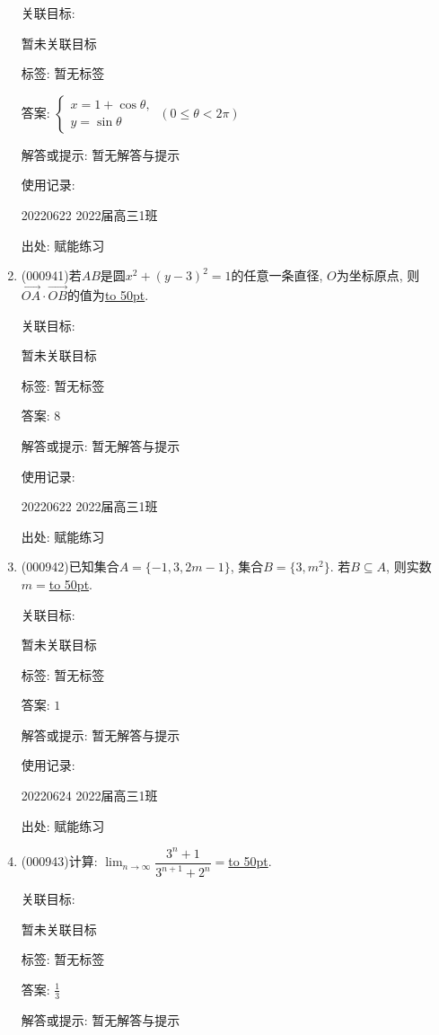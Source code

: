 \documentclass[10pt,a4paper]{article}
\newcommand{\blank}[1]{\underline{\hbox to #1pt{}}}
\begin{document}
\begin{enumerate}[1.]
关联目标:

暂未关联目标



标签: 暂无标签

答案: $\begin{cases} x=1+\cos \theta, \\ y=\sin \theta  \end{cases} \ (0\le \theta <2\pi)$

解答或提示: 暂无解答与提示

使用记录:

20220622	2022届高三1班	


出处: 赋能练习
\item { (000941)}若$AB$是圆$x^2+(y-3)^2=1$的任意一条直径, $O$为坐标原点, 则$\overrightarrow{OA}\cdot \overrightarrow{OB}$的值为\blank{50}.


关联目标:

暂未关联目标



标签: 暂无标签

答案: $8$

解答或提示: 暂无解答与提示

使用记录:

20220622	2022届高三1班	


出处: 赋能练习
\item { (000942)}已知集合$A=\{-1,3,2m-1\}$, 集合$B=\{3,m^2\}$. 若$B\subseteq A$, 则实数$m=$\blank{50}.


关联目标:

暂未关联目标



标签: 暂无标签

答案: $1$

解答或提示: 暂无解答与提示

使用记录:

20220624	2022届高三1班	


出处: 赋能练习
\item { (000943)}计算: $\displaystyle\lim_{n\to\infty}\dfrac{3^n+1}{3^{n+1}+2^n}=$\blank{50}.


关联目标:

暂未关联目标



标签: 暂无标签

答案: $\frac 13$

解答或提示: 暂无解答与提示


\end{enumerate}
\end{document}
